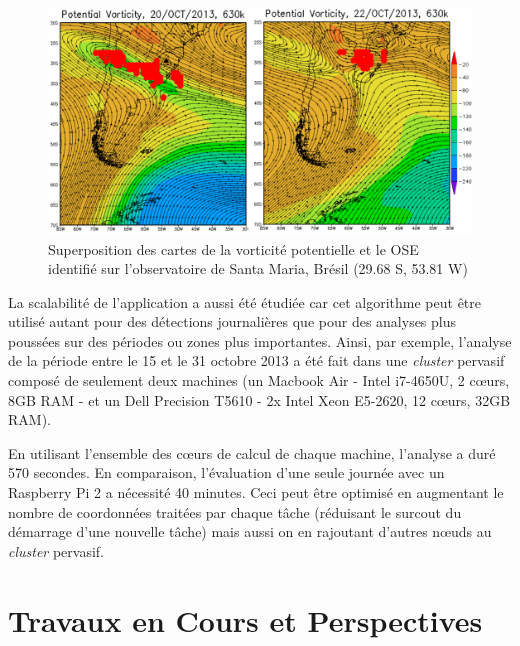 \begin{figure}
	\centering
	\includegraphics[width=0.75\linewidth]{img/comparison2}
	\caption{Superposition des cartes de la vorticité potentielle et le OSE identifié sur l'observatoire de Santa Maria, Brésil (29.68 S, 53.81 W)}\label{fig:comparison}
\end{figure}

La scalabilité de l'application a aussi été étudiée car cet algorithme peut être utilisé autant pour des détections journalières que pour des analyses plus poussées sur des périodes ou zones plus importantes. Ainsi, par exemple, l'analyse de la période entre le 15 et le 31 octobre 2013 a été fait dans une \textit{cluster} pervasif composé de seulement deux machines (un Macbook Air  - Intel i7-4650U, 2 c{\oe}urs, 8GB RAM -  et un Dell Precision T5610 - 2x Intel Xeon E5-2620, 12 c{\oe}urs, 32GB RAM). 

En utilisant l'ensemble des c{\oe}urs de calcul de chaque machine, l'analyse a duré 570 secondes. En comparaison, l'évaluation d'une seule journée avec un Raspberry Pi 2 a nécessité 40 minutes. Ceci peut être optimisé en augmentant le nombre de coordonnées traitées par chaque tâche (réduisant le surcout du démarrage d'une nouvelle tâche) mais aussi on en rajoutant d'autres n{\oe}uds au \textit{cluster} pervasif.  %

\section{Travaux en Cours et Perspectives}

